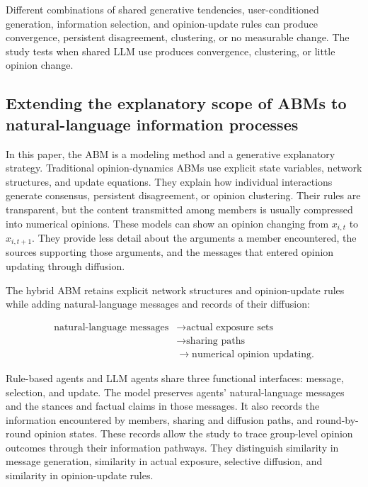 \documentclass[11pt,a4paper]{article}
\begin{document}
Different combinations of shared generative tendencies, user-conditioned generation, information selection, and opinion-update rules can produce convergence, persistent disagreement, clustering, or no measurable change. The study tests when shared LLM use produces convergence, clustering, or little opinion change.

\subsection{Extending the explanatory scope of ABMs to natural-language information processes}

In this paper, the ABM is a modeling method and a generative explanatory strategy. Traditional opinion-dynamics ABMs use explicit state variables, network structures, and update equations. They explain how individual interactions generate consensus, persistent disagreement, or opinion clustering. Their rules are transparent, but the content transmitted among members is usually compressed into numerical opinions. These models can show an opinion changing from $x_{i,t}$ to $x_{i,t+1}$. They provide less detail about the arguments a member encountered, the sources supporting those arguments, and the messages that entered opinion updating through diffusion.

The hybrid ABM retains explicit network structures and opinion-update rules while adding natural-language messages and records of their diffusion:

\begin{equation*}
\begin{aligned}\text{natural-language messages} &\rightarrow \text{actual exposure sets} \\
&\rightarrow \text{sharing paths} \\
&\rightarrow \text{numerical opinion updating}.\end{aligned}
\end{equation*}

Rule-based agents and LLM agents share three functional interfaces: message, selection, and update. The model preserves agents' natural-language messages and the stances and factual claims in those messages. It also records the information encountered by members, sharing and diffusion paths, and round-by-round opinion states. These records allow the study to trace group-level opinion outcomes through their information pathways. They distinguish similarity in message generation, similarity in actual exposure, selective diffusion, and similarity in opinion-update rules.
\end{document}
